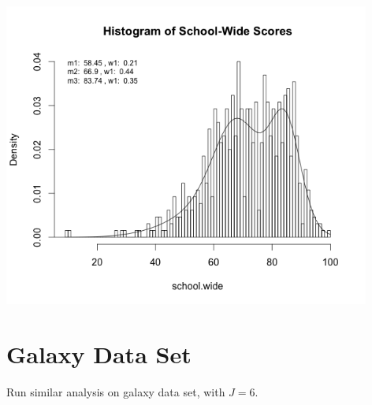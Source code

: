 \documentclass[12pt,letterpaper]{article}\usepackage[]{graphicx}\usepackage[]{color}
\begin{document}
\includegraphics[height=10cm, keepaspectratio]{scores-fitted-mixtures.png}\\


\section{Galaxy Data Set}
Run similar analysis on galaxy data set, with $J=6$.
\end{document}
